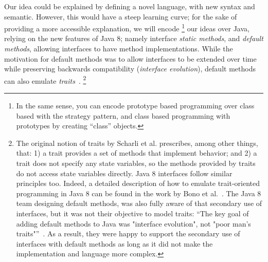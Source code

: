 Our idea could be explained by defining a novel language, with new syntax and semantic.
However, this would have a
steep learning curve; for the sake of providing a more accessible explanation, we will encode
\footnote{
In the same sense, you can encode prototype based programming over class based with
the strategy pattern, and class based programming with prototypes by creating ``class'' objects.
} our ideas
over Java, relying on the new features of Java 8; namely
interface \emph{static methods}, and \emph{default methods}, allowing interfaces to have
method implementations. While the motivation for default methods was
to allow interfaces to be extended over time while preserving backwards
compatibility (\emph{interface evolution}),
 default methods can also emulate \emph{traits}~\cite{scharli03traits}.
\footnote{The
original notion of traits by Scharli et al. prescribes, among other
things, that: 1) a trait provides a set of methods that implement
behavior; and 2) a trait does not specify any state variables, so the
methods provided by traits do not access state variables
directly. Java 8 interfaces follow similar principles too. Indeed, a
detailed description of how to emulate trait-oriented programming in
Java 8 can be found in the work by Bono et al.~\cite{bono14}. The Java 8
team designing default methods, was also fully aware of that secondary
use of interfaces, but it was not their objective to model traits:
``The key goal of adding default methods to Java was "interface
evolution", not "poor man's traits"''~\cite{goetz13default}. As a result, 
they were happy to support the secondary use of interfaces with
default methods as long as it did not make the implementation and
language more complex.}




%
%
%
%

